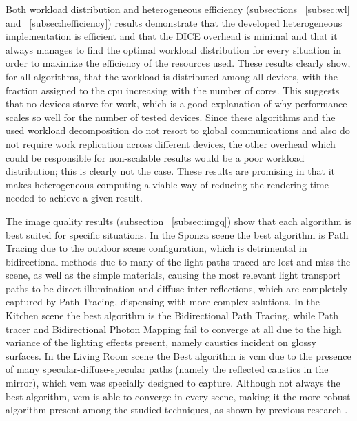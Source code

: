 Both workload distribution and heterogeneous efficiency (subsections ~\ref{subsec:wl} and ~\ref{subsec:hefficiency}) results demonstrate that the developed heterogeneous implementation is efficient and that the DICE overhead is minimal and that it always manages to find the optimal workload distribution for every situation in order to maximize the efficiency of the resources used. These results clearly show, for all algorithms, that the workload is distributed among all devices, with the fraction assigned to the \gls{cpu} increasing with the number of cores. This suggests that no devices starve for work, which is a good explanation of why performance scales so well for the number of tested devices. Since these algorithms and the used workload decomposition do not resort to global communications and also do not require work replication across different devices, the other overhead which could be responsible for non-scalable results would be a poor workload distribution; this is clearly not the case. These results are promising in that it makes heterogeneous computing a viable way of reducing the rendering time needed to achieve a given result.

The image quality results (subsection ~\ref{subsec:imgq}) show that each algorithm is best suited for specific situations. In the Sponza scene the best algorithm is Path Tracing due to the outdoor scene configuration, which is detrimental in bidirectional methods due to many of the light paths traced are lost and miss the scene, as well as the simple materials, causing the most relevant light transport paths to be direct illumination and diffuse inter-reflections, which are completely captured by Path Tracing, dispensing with more complex solutions. In the Kitchen scene the best algorithm is the Bidirectional Path Tracing, while Path tracer and Bidirectional Photon Mapping fail to converge at all due to the high variance of the lighting effects present, namely caustics incident on glossy surfaces. In the Living Room scene the Best algorithm is \gls{vcm} due to the presence of many specular-diffuse-specular paths (namely the reflected caustics in the mirror), which \gls{vcm} was specially designed to capture. Although not always the best algorithm, \gls{vcm} is able to converge in every scene, making it the more robust algorithm present among the studied techniques, as shown by previous research \citep{davidovivc2014progressive}.


